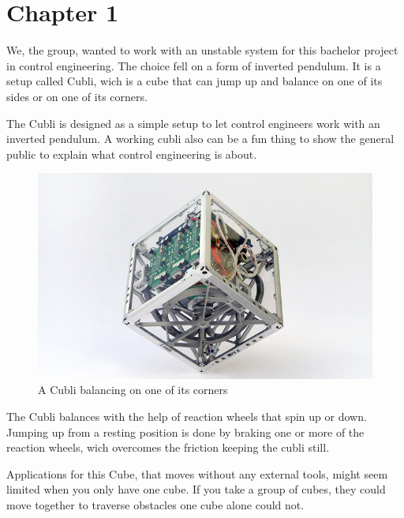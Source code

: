 \chapter{Chapter 1}
We, the group, wanted to work with an unstable system for this bachelor project in control engineering. The choice fell on a form of inverted pendulum. It is a setup called Cubli, wich is a cube that can jump up and balance on one of its sides or on one of its corners.

The Cubli is designed as a simple setup to let control engineers work with an inverted pendulum. A working cubli also can be a fun thing to show the general public to explain what control engineering is about.  \cite{MGajamohan}

\begin{figure}[H] 
	\centering 
	\includegraphics[scale=1.5]{figures/CubliCorner-700x430}
	\caption{A Cubli balancing on one of its corners\cite{RAndrea}}
	\label{CubliCorner}
\end{figure} 

The Cubli balances with the help of reaction wheels that spin up or down. Jumping up from a resting position is done by braking one or more of the reaction wheels, wich overcomes the friction keeping the cubli still. 

Applications for this Cube, that moves without any external tools, might seem limited when you only have one cube. If you take a group of cubes, they could move together to traverse obstacles one cube alone could not. \cite{JRomanishin}





